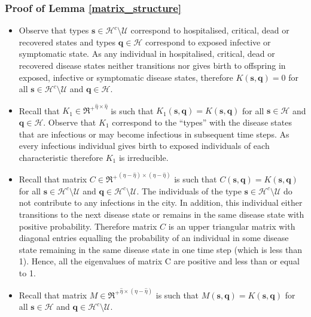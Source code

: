 \documentclass{article}
\theoremstyle{definition}
\begin{document}
\label{Appendix 1}

\subsubsection{Proof of Lemma \ref{matrix_structure}}

\begin{itemize}


\item
Observe that
types $\bm{s} \in \mathcal{H}^c\setminus\mathcal U$ correspond to hospitalised, critical, dead or recovered states and types $\bm{q} \in \mathcal{H}$ correspond to exposed infective or symptomatic state. As any individual in hospitalised, critical, dead or recovered disease states neither transitions nor gives birth to offspring in exposed, infective or symptomatic disease states, therefore $K(\bm{s},\bm{q}) = 0 $ for all $\bm{s} \in  \mathcal{H}^c\setminus\mathcal U$ and  $\bm{q} \in \mathcal{H}$.

\item
Recall that $K_1 \in  {\Re^+}^{\hat{\eta} \times \hat{\eta}}$ is such that
$K_1(\bm{s},\bm{q}) =K(\bm{s},\bm{q}) $ for all $\bm{s} \in\mathcal{H}$ and $\bm{q} \in \mathcal{H}$. Observe that $K_1$ correspond to the ``types'' with the disease states that are infectious or may become infectious in subsequent time steps. As every infectious individual gives birth to exposed individuals of each characteristic therefore $K_1$ is irreducible. 


\item
Recall that matrix $C \in {\Re^+}^{(\eta - \hat{\eta}) \times (\eta - \hat{\eta})} $ is such that
$C(\bm{s},\bm{q}) =K(\bm{s},\bm{q}) $ for all $\bm{s} \in \mathcal{H}^c\setminus\mathcal U$ and $\bm{q} \in  \mathcal{H}^c\setminus\mathcal U$. The individuals of the type $\bm{s} \in \mathcal{H}^c\setminus\mathcal U$ do not contribute to any infections in the city. In addition, this individual either transitions to the next disease state or remains in the same disease state with positive probability. Therefore matrix $C$ is an upper triangular matrix with diagonal entries equalling the probability of an individual in some disease state remaining in the same disease state in one time step (which is less than 1).  Hence, all the eigenvalues of matrix C are positive and less than or equal to 1. 


\item
Recall that matrix $M \in {\Re^+}^{\hat{\eta} \times (\eta - \hat{\eta})} $ is such that
$M(\bm{s},\bm{q}) =K(\bm{s},\bm{q}) $ for all $\bm{s} \in \mathcal{H}$ and $\bm{q} \in\mathcal{H}^c\setminus\mathcal U$. 
\end{itemize}
\end{document}
